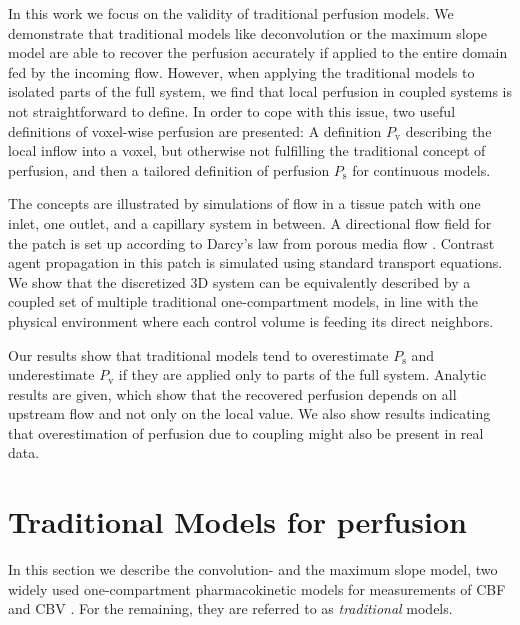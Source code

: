 \documentclass[journal,twocolumn]{IEEEtran}
\newcommand{\Perfv}{P_{\mathrm{v}}}
\newcommand{\Perfs}{P_{\mathrm{s}}}
\begin{document}

	In this work we focus on the validity of traditional perfusion models.
	We  demonstrate that traditional models like deconvolution or the maximum slope model are able to recover the perfusion accurately if applied to the entire domain fed by the incoming flow.
	However, when applying the traditional models to isolated parts of the full system, we find that local perfusion in coupled systems is not straightforward to define.
	In order to cope with this issue, two useful definitions of voxel-wise perfusion are presented: A definition $\Perfv$ describing the local inflow into a voxel, but otherwise not fulfilling the traditional concept of perfusion, and then a tailored definition of perfusion $\Perfs$ for continuous models.

The concepts are illustrated by simulations of flow in a tissue patch with one inlet, one outlet, and a capillary system in between.
	A directional flow field for the patch is set up according to Darcy's law from porous media flow \cite{Darcy56}.
	Contrast agent propagation in this patch is simulated using standard transport equations.
	We show that the discretized 3D system can be equivalently described by a coupled set of multiple traditional one-compartment models, in line with the physical environment where each control volume is feeding its direct neighbors.

	
	Our results show that traditional models tend to overestimate $\Perfs$ and underestimate $\Perfv$ if they are applied only to parts of the full system.
	Analytic results are given, which show that the recovered perfusion depends on all upstream flow and not only on the local value.
	We also show results indicating that overestimation of perfusion due to coupling might also be present in real data.

	

	\section{Traditional Models for perfusion} \label{sec:traditional}

	In this section we describe the convolution- and the maximum slope model, two widely used one-compartment pharmacokinetic models for measurements of CBF and CBV \cite{Feng2013,Chen2011,kudo10}.
	For the remaining, they are referred to as \emph{traditional} models.
\end{document}
